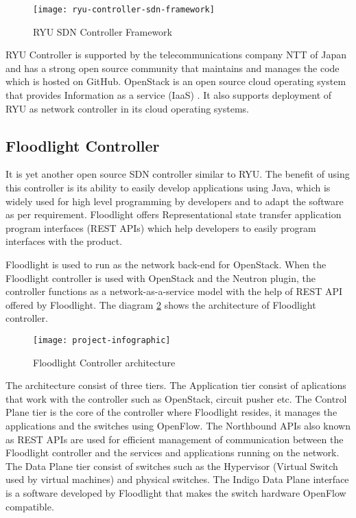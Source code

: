 \begin{figure}
	  \centering
	  \texttt{[image: ryu-controller-sdn-framework]}
	  \caption{RYU SDN Controller Framework \cite{ryu_framewrk_png}} \label{fig:ryu-controller-sdn-framework}
	  \vspace{-10pt}
\end{figure}

RYU Controller is supported by the telecommunications company \gls{NTT} of Japan and has a strong open source community that maintains and manages the code which is hosted on GitHub. OpenStack is an open source cloud operating system that provides Information as a service (IaaS) \cite{OpenStack}. It also supports deployment of RYU as network controller in its cloud operating systems.
\subsection{Floodlight Controller \cite{Floodlight_defn}} \label{Floodlight_Controller}

It is yet another open source SDN controller similar to RYU. The benefit of using this controller is its ability to easily develop applications using Java, which is widely used for high level programming by developers and to adapt the software as per requirement. Floodlight offers Representational state transfer application program interfaces (REST APIs) which help developers to easily program interfaces with the product.

Floodlight is used to run as the network back-end for OpenStack. When the Floodlight controller is used with OpenStack and the Neutron plugin, the controller functions as a network-as-a-service model with the help of REST API offered by Floodlight. The diagram \ref{fig:Floodlight_arch} shows the architecture of Floodlight controller.

\begin{figure}
	\centering
	\texttt{[image: project-infographic]}
	\caption{Floodlight Controller architecture \cite{Floodlight_arch}} \label{fig:Floodlight_arch}
	\vspace{-10pt}
\end{figure}

The architecture consist of three tiers. The Application tier consist of aplications that work with the controller such as OpenStack, circuit pusher etc. The Control Plane tier is the core of the controller where Floodlight resides, it manages the applications and the switches using OpenFlow. The Northbound APIs also known as REST APIs are used for efficient management of communication between the Floodlight controller and the services and applications running on the network. The Data Plane tier consist of switches such as the Hypervisor (Virtual Switch used by virtual machines) and physical switches. The Indigo Data Plane interface is a software developed by Floodlight that makes the switch hardware OpenFlow compatible.

